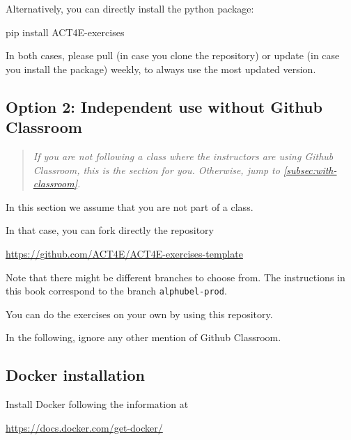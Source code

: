 Alternatively, you can directly install the python package:

\begin{console}
    pip install ACT4E-exercises
\end{console}

In both cases, please pull (in case you clone the repository) or update (in case you install the package) weekly, to always use the most updated version.

\subsection{Option 2: Independent use without Github Classroom}
\label{subsec:without-classroom}

\begin{quote}
    \emph{
        If you are \emph{not} following a class where the instructors are using Github Classroom,
        this is the section for you.
        Otherwise, jump to \cref{subsec:with-classroom}.
    }
\end{quote}

In this section we assume that you are not part of a class.

In that case, you can fork directly the repository

\url{https://github.com/ACT4E/ACT4E-exercises-template}

Note that there might be different branches to choose from.
The instructions in this book correspond to the branch \texttt{alphubel-prod}.

You can do the exercises on your own by using this repository.

In the following, ignore any other mention of Github Classroom.

\subsection{Docker installation}

Install Docker following the information at

\url{https://docs.docker.com/get-docker/}

